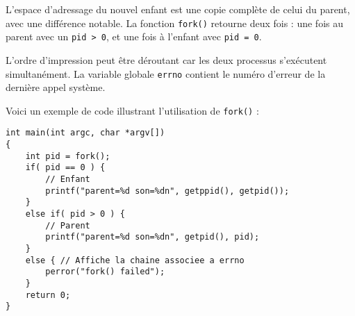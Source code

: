\documentclass[12pt]{article}
\begin{document}
L'espace d'adressage du nouvel enfant est une copie complète de celui du parent, avec une différence notable. La fonction \texttt{fork()} retourne deux fois : une fois au parent avec un \texttt{pid > 0}, et une fois à l'enfant avec \texttt{pid = 0}.

\begin{tcolorbox}[title={Intuition}]
L'ordre d'impression peut être déroutant car les deux processus s'exécutent simultanément. La variable globale \texttt{errno} contient le numéro d'erreur de la dernière appel système.
\end{tcolorbox}

Voici un exemple de code illustrant l'utilisation de \texttt{fork()} :

\begin{lstlisting}
int main(int argc, char *argv[])
{
    int pid = fork();
    if( pid == 0 ) {
        // Enfant
        printf("parent=%d son=%dn", getppid(), getpid());
    }
    else if( pid > 0 ) {
        // Parent
        printf("parent=%d son=%dn", getpid(), pid);
    }
    else { // Affiche la chaine associee a errno
        perror("fork() failed");
    }
    return 0;
}
\end{lstlisting}
\end{document}
